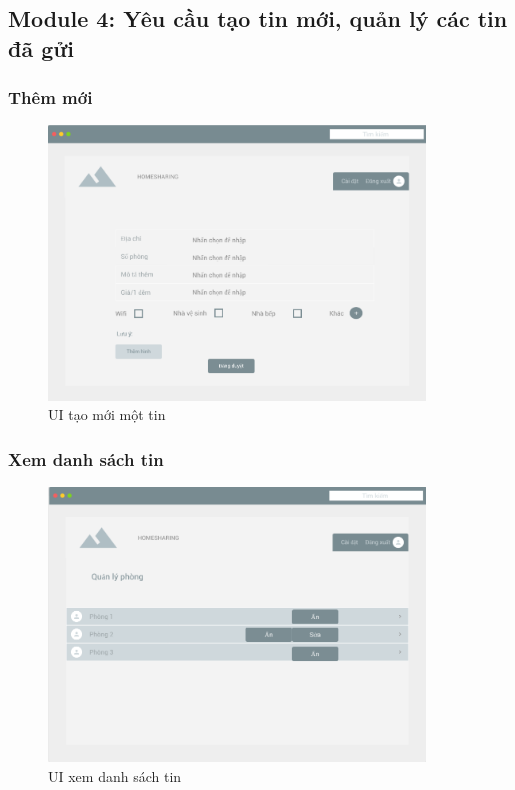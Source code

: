\subsection{Module 4: Yêu cầu tạo tin mới, quản lý các tin đã gửi}
\subsubsection{Thêm mới}
\begin{figure}[H]
	\centering
	\includegraphics[width=10cm]{parts/bao/images/createPost.png}
	\vspace{0.5cm}
	\caption{UI tạo mới một tin}
\end{figure}

\subsubsection{Xem danh sách tin}
\begin{figure}[H]
	\centering
	\includegraphics[width=10cm]{parts/bao/images/roomManager.png}
	\vspace{0.5cm} 
	\caption{UI xem danh sách tin}
\end{figure}
\newpage 
